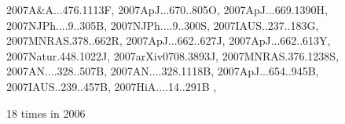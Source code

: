 \documentclass[12pt]{article}
\begin{document}
\begin{description}
{2007A&A...476.1113F,%
2007ApJ...670..805O,%
2007ApJ...669.1390H,%
2007NJPh....9..305B,%
2007NJPh....9..300S,%
2007IAUS..237..183G,%
2007MNRAS.378..662R,%
2007ApJ...662..627J,%
2007ApJ...662..613Y,%
2007Natur.448.1022J,%
2007arXiv0708.3893J,%
2007MNRAS.376.1238S,%
2007AN....328..507B,%
2007AN....328.1118B,%
2007ApJ...654..945B,%
2007IAUS..239..457B,%
2007HiA....14..291B%
},\item
18 times in 2006 \citep{
2006ApJ...653..558O,%
2006A&A...459..935H,%
2006A&A...457..371F,%
2006MNRAS.370..529D,%
2006PhFl...18g5106H,%
}
\end{description}
\end{document}
